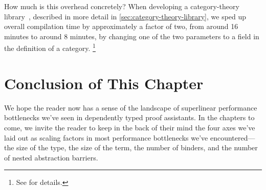 How much is this overhead concretely?
When developing a category-theory library~\cite{category-coq-experience}, described in more detail in \autoref{sec:category-theory-library}, we sped up overall compilation time by approximately a factor of two, from around 16 minutes to around 8 minutes, by changing one of the two parameters to a field in the definition of a category.%
\footnote{%
  See  for details.%
}

%
%

\section{Conclusion of This Chapter}

We hope the reader now has a sense of the landscape of superlinear performance bottlenecks we've seen in dependently typed proof assistants.
In the chapters to come, we invite the reader to keep in the back of their mind the four axes we've laid out as scaling factors in most performance bottlenecks we've encountered---the size of the type, the size of the term, the number of binders, and the number of nested abstraction barriers.

%
%

